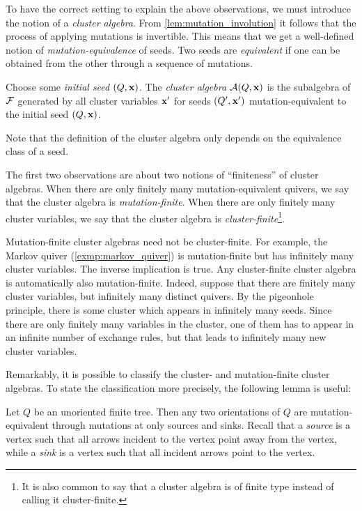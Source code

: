 To have the correct setting to explain the above observations, we must introduce the
notion of a \emph{cluster algebra}. From
\cref{lem:mutation_involution} it follows that the process of applying mutations is
invertible. This means that we get a well-defined notion of
\emph{mutation-equivalence} of seeds. Two seeds are
\emph{equivalent} if one can be obtained from the other through
a sequence of mutations.
\begin{definition}

	Choose some \emph{initial seed} $(Q, \mathbf{x})$. The \emph{cluster
		algebra} $\mathcal{A} (Q, \mathbf{x})$ is the subalgebra of $\mathcal{F}$
	generated by all cluster variables $\mathbf{x}'$ for seeds $(Q', \mathbf{x}')$ mutation-equivalent to
	the initial seed $(Q, \mathbf{x})$.
\end{definition}
\begin{remark}

	Note that the definition of the cluster algebra only depends on the equivalence class
	of a seed.
\end{remark}

The first two observations are about two notions of ``finiteness'' of cluster algebras.
When there are only finitely many mutation-equivalent quivers, we say that the cluster
algebra is \emph{mutation-finite}. When there are only finitely
many cluster variables, we say that the cluster algebra is
\emph{cluster-finite}\footnote{It is also common to say that a
	cluster algebra is of finite type instead of calling it cluster-finite.}.

Mutation-finite cluster algebras need not be cluster-finite. For example, the Markov
quiver (\cref{exmp:markov_quiver}) is mutation-finite but has infinitely many cluster
variables. The inverse implication is true. Any cluster-finite cluster algebra is
automatically also mutation-finite. Indeed, suppose that there are finitely many
cluster variables, but infinitely many distinct quivers. By the pigeonhole principle,
there is some cluster which appears in infinitely many seeds. Since there are only
finitely many variables in the cluster, one of them has to appear in an infinite number
of exchange rules, but that leads to infinitely many new cluster variables.

Remarkably, it is possible to classify the cluster- and mutation-finite cluster
algebras. To state the classification more precisely, the following lemma is useful:
\begin{lemma}

	Let $Q$ be an unoriented finite tree. Then any two orientations of $Q$ are
	mutation-equivalent through mutations at only sources and sinks. Recall that a
	\emph{source} is a vertex such that all arrows incident to the vertex
	point away from the vertex, while a \emph{sink} is a vertex such that all
	incident arrows point to the vertex.
\end{lemma}

